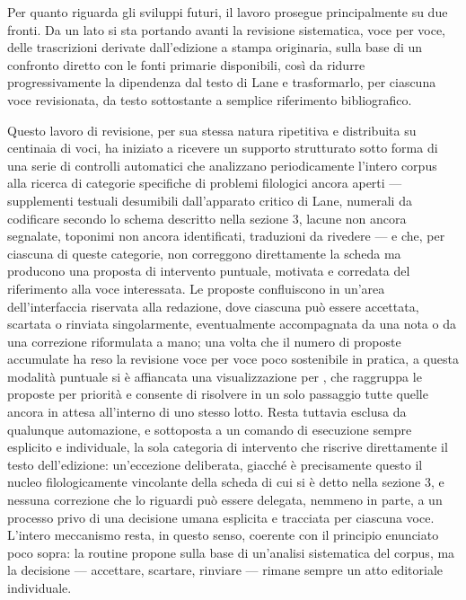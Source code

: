 \documentclass[11pt,a4paper]{article}
\begin{document}
Per quanto riguarda gli sviluppi futuri, il lavoro prosegue
principalmente su due fronti. Da un lato si sta portando avanti la
revisione sistematica, voce per voce, delle trascrizioni derivate
dall'edizione a stampa originaria, sulla base di un confronto diretto
con le fonti primarie disponibili, così da ridurre progressivamente la
dipendenza dal testo di Lane e trasformarlo, per ciascuna voce
revisionata, da testo sottostante a semplice riferimento bibliografico.

Questo lavoro di revisione, per sua stessa natura ripetitiva e
distribuita su centinaia di voci, ha iniziato a ricevere un supporto
strutturato sotto forma di una serie di controlli automatici che
analizzano periodicamente l'intero corpus alla ricerca di categorie
specifiche di problemi filologici ancora aperti --- supplementi
testuali desumibili dall'apparato critico di Lane, numerali da
codificare secondo lo schema descritto nella sezione 3, lacune non
ancora segnalate, toponimi non ancora identificati, traduzioni da
rivedere --- e che, per ciascuna di queste categorie, non correggono
direttamente la scheda ma producono una proposta di intervento
puntuale, motivata e corredata del riferimento alla voce interessata.
Le proposte confluiscono in un'area dell'interfaccia riservata alla
redazione, dove ciascuna può essere accettata, scartata o rinviata
singolarmente, eventualmente accompagnata da una nota o da una
correzione riformulata a mano; una volta che il numero di proposte
accumulate ha reso la revisione voce per voce poco sostenibile in
pratica, a questa modalità puntuale si è affiancata una
visualizzazione per , che raggruppa le proposte per
priorità e consente di risolvere in un solo passaggio tutte quelle
ancora in attesa all'interno di uno stesso lotto. Resta tuttavia
esclusa da qualunque automazione, e sottoposta a un comando di
esecuzione sempre esplicito e individuale, la sola categoria di
intervento che riscrive direttamente il testo dell'edizione:
un'eccezione deliberata, giacché è precisamente questo il nucleo
filologicamente vincolante della scheda di cui si è detto nella
sezione 3, e nessuna correzione che lo riguardi può essere delegata,
nemmeno in parte, a un processo privo di una decisione umana esplicita
e tracciata per ciascuna voce. L'intero meccanismo resta, in questo
senso, coerente con il principio enunciato poco sopra: la routine
propone sulla base di un'analisi sistematica del corpus, ma la
decisione --- accettare, scartare, rinviare --- rimane sempre un atto
editoriale individuale.
\end{document}
